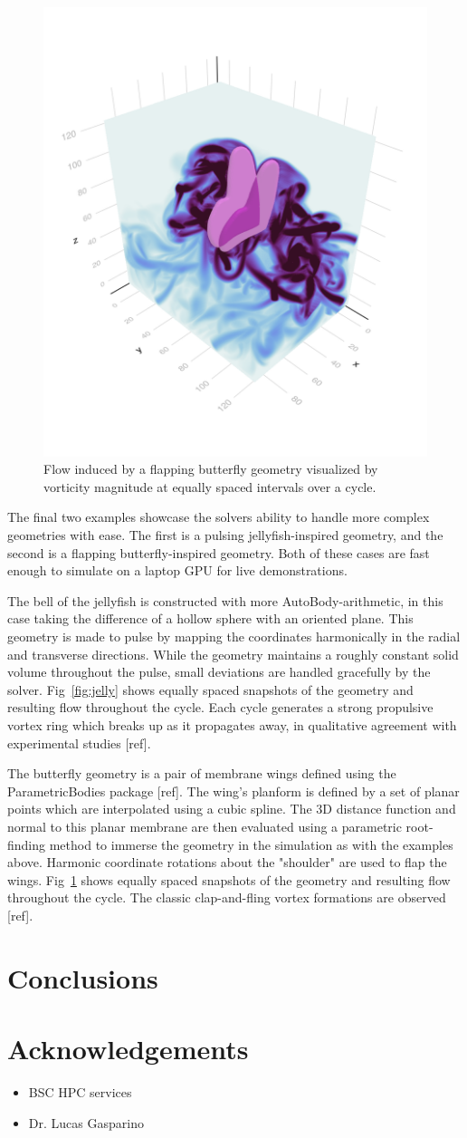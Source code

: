 \documentclass[final,3p,times]{elsarticle}
\begin{document}
\begin{figure}
    \includegraphics[width=0.32\linewidth,trim={90 150 70 200},clip]{jl/examples/Butterfly_6.png}
    
    \caption{Flow induced by a flapping butterfly geometry visualized by vorticity magnitude at equally spaced intervals over a cycle.}
    \label{fig:butterfly}
\end{figure}
The final two examples showcase the solvers ability to handle more complex geometries with ease. The first is a pulsing jellyfish-inspired geometry, and the second is a flapping butterfly-inspired geometry. Both of these cases are fast enough to simulate on a laptop GPU for live demonstrations.

The bell of the jellyfish is constructed with more AutoBody-arithmetic, in this case taking the difference of a hollow sphere with an oriented plane. This geometry is made to pulse by mapping the coordinates harmonically in the radial and transverse directions. While the geometry maintains a roughly constant solid volume throughout the pulse, small deviations are handled gracefully by the solver. Fig~\ref{fig:jelly} shows equally spaced snapshots of the geometry and resulting flow throughout the cycle. Each cycle generates a strong propulsive vortex ring which breaks up as it propagates away, in qualitative agreement with experimental studies [ref].

The butterfly geometry is a pair of membrane wings defined using the ParametricBodies package [ref]. The wing's planform is defined by a set of planar points which are interpolated using a cubic spline. The 3D distance function and normal to this planar membrane are then evaluated using a parametric root-finding method to immerse the geometry in the simulation as with the examples above. Harmonic coordinate rotations about the "shoulder" are used to flap the wings. Fig~\ref{fig:butterfly} shows equally spaced snapshots of the geometry and resulting flow throughout the cycle. The classic clap-and-fling vortex formations are observed [ref].

\section{Conclusions}\label{sec:conclusions}

\section{Acknowledgements}\label{sec:acknowledgements}
\begin{itemize}
    \item BSC HPC services
    \item Dr. Lucas Gasparino
\end{itemize}



\end{document}
